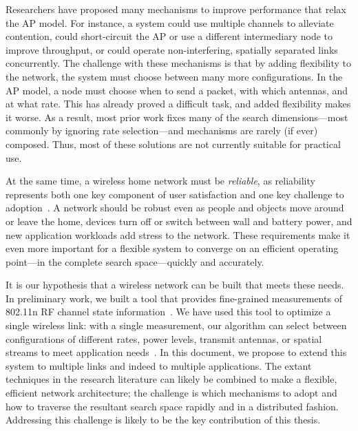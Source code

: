 Researchers have proposed many mechanisms to improve performance that relax the AP model. For instance, a system could use multiple channels to alleviate contention, could short-circuit the AP or use a different intermediary node to improve throughput, or could operate non-interfering, spatially separated links concurrently. The challenge with these mechanisms is that by adding flexibility to the network, the system must choose between many more configurations. In the AP model, a node must choose when to send a packet, with which antennas, and at what rate. This has already proved a difficult task, and added flexibility makes it worse. As a result, most prior work fixes many of the search dimensions---most commonly by ignoring rate selection---and mechanisms are rarely (if ever) composed. Thus, most of these solutions are not currently suitable for practical use.


At the same time, a wireless home network must be \emph{reliable}, as reliability represents both one key component of user satisfaction and one key challenge to adoption~\cite{edwards_challenges}. A network should be robust even as people and objects move around or leave the home, devices turn off or switch between wall and battery power, and new application workloads add stress to the network. These requirements make it even more important for a flexible system to converge on an efficient operating point---in the complete search space---quickly and accurately.

It is our hypothesis that a wireless network can be built that meets these needs. In preliminary work, we built a tool that provides fine-grained measurements of 802.11n RF channel state information~\cite{halperin_csitool}. We have used this tool to optimize a single wireless link: with a single measurement, our algorithm can select between configurations of different rates, power levels, transmit antennas, or spatial streams to meet application needs~\cite{halperin_esnr}. In this document, we propose to extend this system to multiple links and indeed to multiple applications. The extant techniques in the research literature can likely be combined to make a flexible, efficient network architecture; the challenge is which mechanisms to adopt and how to traverse the resultant search space rapidly and in a distributed fashion. Addressing this challenge is likely to be the key contribution of this thesis.

